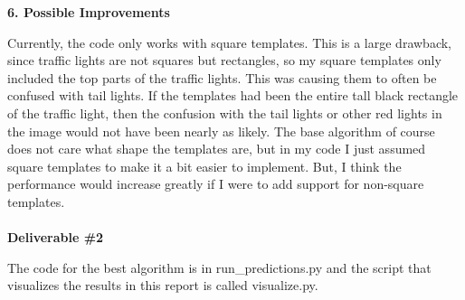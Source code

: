 \documentclass[12pt,letterpaper]{article} \usepackage{fullpage}
\begin{document}
\textbf{6. Possible Improvements}

Currently, the code only works with square templates. This is a large drawback, since
traffic lights are not squares but rectangles, so my square templates only included
the top parts of the traffic lights. This was causing them to often be confused with
tail lights. If the templates had been the entire tall black rectangle of the traffic
light, then the confusion with the tail lights or other red lights in the image would
not have been nearly as likely. The base algorithm of course does not care what shape
the templates are, but in my code I just assumed square templates to make it a bit
easier to implement. But, I think the performance would increase greatly if I were to
add support for non-square templates.\\\\

\textbf{Deliverable \#2}

The code for the best algorithm is in run\_predictions.py and the script
that visualizes the results in this report is called visualize.py.
\end{document}
